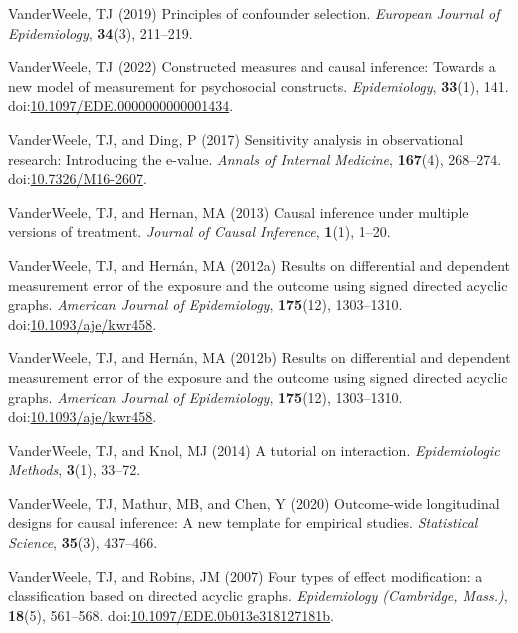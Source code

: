 \documentclass[
  singlecolumn]{article}
\newlength{\cslhangindent}
\newenvironment{CSLReferences}[2] %
 {\begin{list}{}{%
  \setlength{\itemindent}{0pt}
  \setlength{\leftmargin}{0pt}
  \setlength{\parsep}{0pt}
  \ifodd #1
   \setlength{\leftmargin}{\cslhangindent}
   \setlength{\itemindent}{-1\cslhangindent}
  \fi
  \setlength{\itemsep}{#2\baselineskip}}}
 {\end{list}}
\begin{document}
\begin{CSLReferences}{1}{0}
VanderWeele, TJ (2019) Principles of confounder selection.
\emph{European Journal of Epidemiology}, \textbf{34}(3), 211--219.

VanderWeele, TJ (2022) Constructed measures and causal inference:
Towards a new model of measurement for psychosocial constructs.
\emph{Epidemiology}, \textbf{33}(1), 141.
doi:\href{https://doi.org/10.1097/EDE.0000000000001434}{10.1097/EDE.0000000000001434}.

VanderWeele, TJ, and Ding, P (2017) Sensitivity analysis in
observational research: Introducing the e-value. \emph{Annals of
Internal Medicine}, \textbf{167}(4), 268--274.
doi:\href{https://doi.org/10.7326/M16-2607}{10.7326/M16-2607}.

VanderWeele, TJ, and Hernan, MA (2013) Causal inference under multiple
versions of treatment. \emph{Journal of Causal Inference},
\textbf{1}(1), 1--20.

VanderWeele, TJ, and Hernán, MA (2012a) Results on differential and
dependent measurement error of the exposure and the outcome using signed
directed acyclic graphs. \emph{American Journal of Epidemiology},
\textbf{175}(12), 1303--1310.
doi:\href{https://doi.org/10.1093/aje/kwr458}{10.1093/aje/kwr458}.

VanderWeele, TJ, and Hernán, MA (2012b) Results on differential and
dependent measurement error of the exposure and the outcome using signed
directed acyclic graphs. \emph{American Journal of Epidemiology},
\textbf{175}(12), 1303--1310.
doi:\href{https://doi.org/10.1093/aje/kwr458}{10.1093/aje/kwr458}.

VanderWeele, TJ, and Knol, MJ (2014) A tutorial on interaction.
\emph{Epidemiologic Methods}, \textbf{3}(1), 33--72.

VanderWeele, TJ, Mathur, MB, and Chen, Y (2020) Outcome-wide
longitudinal designs for causal inference: A new template for empirical
studies. \emph{Statistical Science}, \textbf{35}(3), 437--466.

VanderWeele, TJ, and Robins, JM (2007) Four types of effect
modification: a classification based on directed acyclic graphs.
\emph{Epidemiology (Cambridge, Mass.)}, \textbf{18}(5), 561--568.
doi:\href{https://doi.org/10.1097/EDE.0b013e318127181b}{10.1097/EDE.0b013e318127181b}.


\end{CSLReferences}
\end{document}
